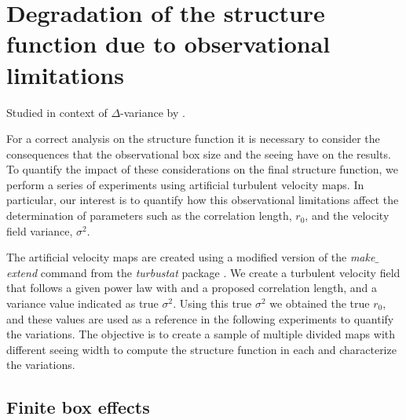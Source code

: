 \documentclass[fleqn,usenatbib, useAMS, a4paper]{mnras}
\begin{document}
\section{Degradation of the structure function due to observational limitations}
\label{sec:degr-struct-funct}
Studied in context of \(\Delta\)-variance by \citet{Bensch:2001l}.

For a correct analysis on the structure function it is necessary to consider the consequences that the observational box size and the seeing have on the results.
To quantify the impact of these considerations on the final structure function, we perform a series of experiments using artificial turbulent velocity maps.
In particular, our interest is to quantify how this observational limitations affect the determination of parameters such as the correlation length, \(r_0\), and the velocity field variance, \(\sigma^2 \). 

The artificial velocity maps are created using a modified version of the \textit{make$\_$extend} command from the \textit{turbustat} package \citep{Koch2019AJ....158....1K}.
We create a turbulent velocity field that follows a given power law with and a proposed correlation length, and a variance value indicated as true \(\sigma^2\).
Using this true \(\sigma^2\) we obtained the true \(r_0\), and these values are used as a reference in the following experiments to quantify the variations.
The objective is to create a sample of multiple divided maps with different seeing width to compute the structure function in each and characterize the variations. 

\subsection{Finite box effects}
\label{sec:finite-box-effects}
\end{document}
